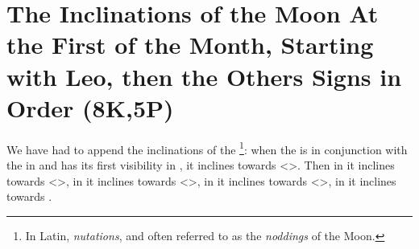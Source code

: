 \section{The Inclinations of the Moon At the First of the Month, Starting with Leo, then the Others Signs in Order (8K,5P)}

We have had to append the inclinations of the \Moon\footnote{In Latin, \textsl{nutations}, and often referred to as the \textsl{noddings} of the Moon.}: when the \Moon\xspace is in conjunction with the \Sun\xspace in \Cancer\xspace and has its first visibility in \Leo, it inclines towards <\Taurus>. Then in \Virgo\xspace it inclines towards <\Aries>, in \Libra\xspace it inclines towards <\Pisces>, in \Scorpio\xspace it inclines towards <\Aquarius>, in \Sagittarius\xspace it inclines towards \Capricorn. 

